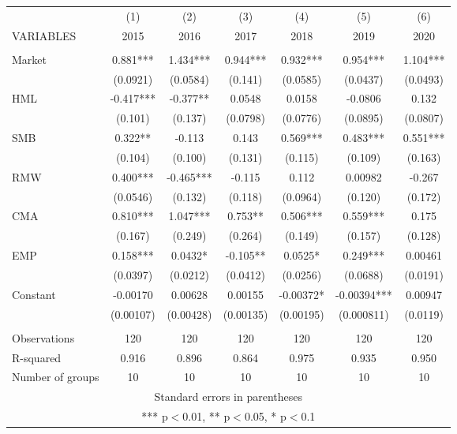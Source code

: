 \begin{tabular}{lcccccc} \hline
 & (1) & (2) & (3) & (4) & (5) & (6) \\
VARIABLES & 2015 & 2016 & 2017 & 2018 & 2019 & 2020 \\ \hline
 &  &  &  &  &  &  \\
Market & 0.881*** & 1.434*** & 0.944*** & 0.932*** & 0.954*** & 1.104*** \\
 & (0.0921) & (0.0584) & (0.141) & (0.0585) & (0.0437) & (0.0493) \\
HML & -0.417*** & -0.377** & 0.0548 & 0.0158 & -0.0806 & 0.132 \\
 & (0.101) & (0.137) & (0.0798) & (0.0776) & (0.0895) & (0.0807) \\
SMB & 0.322** & -0.113 & 0.143 & 0.569*** & 0.483*** & 0.551*** \\
 & (0.104) & (0.100) & (0.131) & (0.115) & (0.109) & (0.163) \\
RMW & 0.400*** & -0.465*** & -0.115 & 0.112 & 0.00982 & -0.267 \\
 & (0.0546) & (0.132) & (0.118) & (0.0964) & (0.120) & (0.172) \\
CMA & 0.810*** & 1.047*** & 0.753** & 0.506*** & 0.559*** & 0.175 \\
 & (0.167) & (0.249) & (0.264) & (0.149) & (0.157) & (0.128) \\
EMP & 0.158*** & 0.0432* & -0.105** & 0.0525* & 0.249*** & 0.00461 \\
 & (0.0397) & (0.0212) & (0.0412) & (0.0256) & (0.0688) & (0.0191) \\
Constant & -0.00170 & 0.00628 & 0.00155 & -0.00372* & -0.00394*** & 0.00947 \\
 & (0.00107) & (0.00428) & (0.00135) & (0.00195) & (0.000811) & (0.0119) \\
 &  &  &  &  &  &  \\
Observations & 120 & 120 & 120 & 120 & 120 & 120 \\
R-squared & 0.916 & 0.896 & 0.864 & 0.975 & 0.935 & 0.950 \\
 Number of groups & 10 & 10 & 10 & 10 & 10 & 10 \\ \hline
\multicolumn{7}{c}{ Standard errors in parentheses} \\
\multicolumn{7}{c}{ *** p$<$0.01, ** p$<$0.05, * p$<$0.1} \\
\end{tabular}
